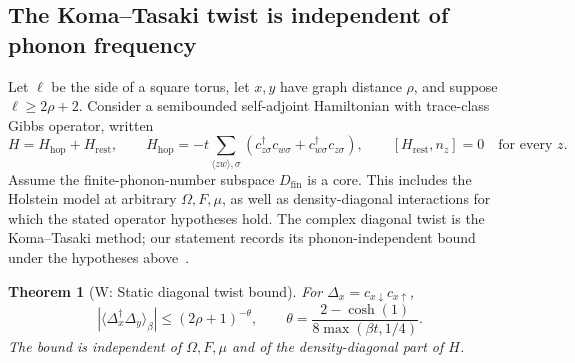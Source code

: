 \documentclass[11pt]{article}
\newtheorem{theorem}{Theorem}[section]
\theoremstyle{definition}
\theoremstyle{remark}
\begin{document}
\subsection{The Koma--Tasaki twist is independent of phonon frequency}

Let $\ell$ be the side of a square torus, let $x,y$ have graph distance $\rho$, and suppose $\ell\geq2\rho+2$. Consider a semibounded self-adjoint Hamiltonian with trace-class Gibbs operator, written
\[
 H=H_{\mathrm{hop}}+H_{\mathrm{rest}},\qquad
 H_{\mathrm{hop}}=-t\sum_{\langle zw\rangle,\sigma}(c_{z\sigma}^\dagger c_{w\sigma}+c_{w\sigma}^\dagger c_{z\sigma}),
 \qquad [H_{\mathrm{rest}},n_z]=0\quad\text{for every }z.
\]
Assume the finite-phonon-number subspace $D_{\mathrm{fin}}$ is a core. This includes the Holstein model at arbitrary $\Omega,F,\mu$, as well as density-diagonal interactions for which the stated operator hypotheses hold.
The complex diagonal twist is the Koma--Tasaki method; our statement records its phonon-independent bound under the hypotheses above~\cite{koma}.

\begin{theorem}[W: Static diagonal twist bound]\label{thm:W}
For $\Delta_x=c_{x\downarrow}c_{x\uparrow}$,
\[
 |\langle\Delta_x^\dagger\Delta_y\rangle_\beta|
 \leq(2\rho+1)^{-\theta},\qquad
 \theta=\frac{2-\cosh(1)}{8\max(\beta t,1/4)}.
\]
The bound is independent of $\Omega,F,\mu$ and of the density-diagonal part of $H$.
\end{theorem}
\end{document}
